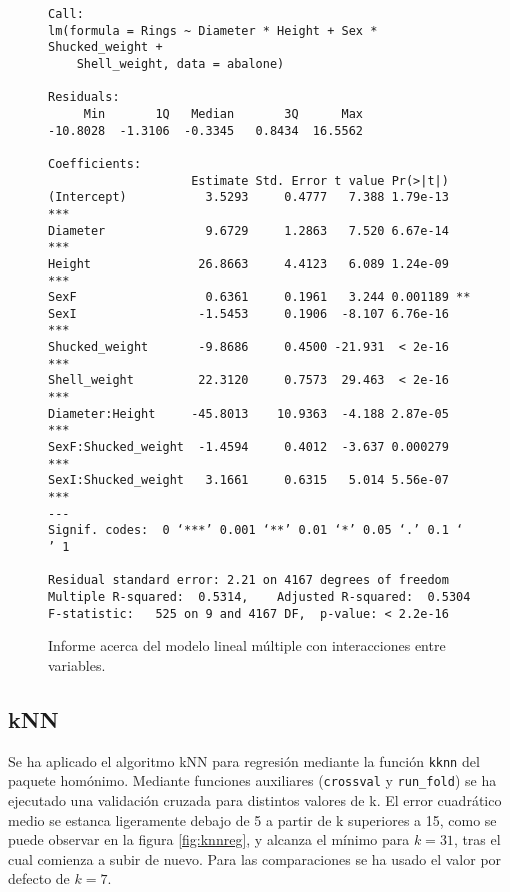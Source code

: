 \documentclass[a4paper, 11pt]{article}
\begin{document}
\begin{figure}[htbp]
  \begin{Verbatim}[fontsize=\scriptsize]
Call:
lm(formula = Rings ~ Diameter * Height + Sex * Shucked_weight + 
    Shell_weight, data = abalone)

Residuals:
     Min       1Q   Median       3Q      Max 
-10.8028  -1.3106  -0.3345   0.8434  16.5562 

Coefficients:
                    Estimate Std. Error t value Pr(>|t|)    
(Intercept)           3.5293     0.4777   7.388 1.79e-13 ***
Diameter              9.6729     1.2863   7.520 6.67e-14 ***
Height               26.8663     4.4123   6.089 1.24e-09 ***
SexF                  0.6361     0.1961   3.244 0.001189 ** 
SexI                 -1.5453     0.1906  -8.107 6.76e-16 ***
Shucked_weight       -9.8686     0.4500 -21.931  < 2e-16 ***
Shell_weight         22.3120     0.7573  29.463  < 2e-16 ***
Diameter:Height     -45.8013    10.9363  -4.188 2.87e-05 ***
SexF:Shucked_weight  -1.4594     0.4012  -3.637 0.000279 ***
SexI:Shucked_weight   3.1661     0.6315   5.014 5.56e-07 ***
---
Signif. codes:  0 ‘***’ 0.001 ‘**’ 0.01 ‘*’ 0.05 ‘.’ 0.1 ‘ ’ 1

Residual standard error: 2.21 on 4167 degrees of freedom
Multiple R-squared:  0.5314,	Adjusted R-squared:  0.5304 
F-statistic:   525 on 9 and 4167 DF,  p-value: < 2.2e-16
  \end{Verbatim}
  \caption{\label{fig:intlm}Informe acerca del modelo lineal múltiple con interacciones entre variables.}  
\end{figure}

\subsection{kNN}

Se ha aplicado el algoritmo kNN para regresión mediante la función \texttt{kknn} del paquete homónimo. Mediante funciones auxiliares (\texttt{crossval} y \texttt{run\_fold}) se ha ejecutado una validación cruzada para distintos valores de k. El error cuadrático medio se estanca ligeramente debajo de 5 a partir de k superiores a 15, como se puede observar en la figura \ref{fig:knnreg}, y alcanza el mínimo para $k=31$, tras el cual comienza a subir de nuevo. Para las comparaciones se ha usado el valor por defecto de $k=7$.
\end{document}
